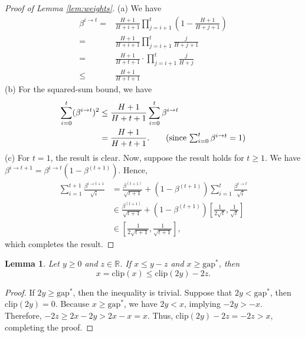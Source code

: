\documentclass[11pt]{article}
\newcommand{\lr}{\beta}
\newtheorem{lemma}{Lemma}
\newcommand{\clip}{\mathrm{clip}}
\newcommand{\gapstar}{\mathrm{gap}^*}
\begin{document}
\begin{proof}[Proof of Lemma \ref{lem:weights}]
(a) We have
\begin{align*}    
\lr^{i\rightarrow t}=&\frac{H+1}{H+i+1}\prod_{j=i+1}^t\left(1-\frac{H+1}{H+j+1}\right)\\
=&\frac{H+1}{H+i+1}\prod_{j=i+1}^t\frac{j}{H+j+1}\\
=&\frac{H+1}{H+t+1}\cdot\prod_{j=i+1}^t\frac{j}{H+j}\\
\leq & \frac{H+1}{H+t+1}
\end{align*}
(b) For the squared-sum bound, we have 
\begin{align*}
\sum_{i=0}^t (\lr^{i\rightarrow t})^2 &\leq \frac{H+1}{H+t+1}\sum_{i=0}^t \lr^{i\rightarrow t} \\
&= \frac{H+1}{H+t+1}.\tag{since $\sum_{i=0}^t \lr^{i\rightarrow t}=1$}
\end{align*}
(c) For $t=1$, the result is clear. Now, suppose the result holds for $t\geq 1$. We have $\lr^{i\rightarrow t+1} = \lr^{i\rightarrow t}(1-\lr^{(t+1)})$. Hence,
\begin{align*}
    \sum_{i=1}^{t+1} \frac{\lr^{i\rightarrow t+1}}{\sqrt{i}} &= \frac{\lr^{(t+1)}}{\sqrt{t+1}} + (1-\lr^{(t+1)})\sum_{i=1}^{t} \frac{\lr^{i\rightarrow t}}{\sqrt{i}} \\
    & \in \frac{\lr^{(t+1)}}{\sqrt{t+1}} + (1-\lr^{(t+1)}) \left[\frac{1}{2\sqrt{t}},\frac{1}{\sqrt{t}}\right]\\
    & \in \left[\frac{1}{2\sqrt{t+1}},\frac{1}{\sqrt{t+1}}\right],
\end{align*}
which completes the result.
\end{proof}

\begin{lemma}\label{lem:clip_ineq}
Let $y \ge 0$ and $z \in \mathbb{R}$. If $x \le y - z$ and $x\geq \gapstar$, then
    \[ x = \clip(x) \le \clip(2y) - 2z. \]
\end{lemma}
\begin{proof}
    If $2y \ge \gapstar$, then the inequality is trivial. Suppose that $2y < \gapstar$, then $\clip(2y) = 0$. Because $x \ge \gapstar$, we have $2y < x$, implying $-2y > -x$. Therefore, $-2z \ge 2x - 2y > 2x - x = x$. Thus, $\clip(2y) - 2z = -2z > x$, completing the proof.
\end{proof}

 
 
\end{document}
